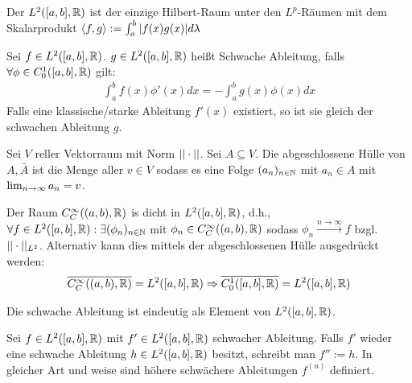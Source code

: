 \begin{satz}
	Der $L^2([a,b],\mathbb{R})$ ist der einzige Hilbert-Raum unter den $L^p$-Räumen mit dem Skalarprodukt $\langle f, g \rangle := \int_{a}^{b} |f(x)g(x)| d\lambda$
\end{satz}

\begin{definition}
	Sei $f \in L^2([a,b],\mathbb{R})$. $g \in L^2([a,b],\mathbb{R})$ heißt Schwache Ableitung, falls $\forall \phi \in C_0^1([a,b],\mathbb{R})$ gilt:
	\begin{align*}
		\int_{a}^{b} f(x) \phi'(x) dx = - \int_{a}^{b} g(x) \phi(x) dx
	\end{align*}
	Falls eine klassische/starke Ableitung $f'(x)$ existiert, so ist sie gleich der schwachen Ableitung $g$. 
\end{definition}

\begin{definition}
	Sei $V$ reller Vektorraum mit Norm $|| \cdot ||$. Sei $A \subseteq V$. Die abgeschlossene Hülle von $A, \bar{A}$ ist die Menge aller $v \in V$ sodass es eine Folge $(a_{n})_{n \in \mathbb{N}}$ mit $a_n \in A $ mit $\lim_{n \rightarrow \infty} a_n = v$.
\end{definition}

\begin{satz}
	Der Raum $C_C^\infty((a,b),\mathbb{R})$ is dicht in $L^2([a,b],\mathbb{R})$, d.h., $\forall f \in L^2([a,b],\mathbb{R}) : \exists (\phi_{n})_{n \in \mathbb{N}}$ mit $\phi_n \in C_C^\infty((a,b),\mathbb{R})$ sodass $\phi_n \overset{n \rightarrow \infty}{\rightarrow} f$ bzgl. $|| \cdot ||_{L^2}$. Alternativ kann dies mittels der abgeschlossenen Hülle ausgedrückt werden:
	\begin{align*}
		\overline{C_C^\infty((a,b),\mathbb{R})} = L^2([a,b],\mathbb{R}) \Rightarrow \overline{C_0^1([a,b],\mathbb{R})} = L^2([a,b],\mathbb{R})
	\end{align*}
\end{satz}

\begin{satz}
	Die schwache Ableitung ist eindeutig als Element von $L^2([a,b],\mathbb{R})$.
\end{satz}

\begin{definition}
	Sei $f \in L^2([a,b],\mathbb{R})$ mit $f' \in L^2([a,b],\mathbb{R})$ schwacher Ableitung. Falls $f'$ wieder eine schwache Ableitung $h \in L^2([a,b],\mathbb{R})$ besitzt, schreibt man $f'' := h$. In gleicher Art und weise sind höhere schwächere Ableitungen $f^{(n)}$ definiert.
\end{definition}


